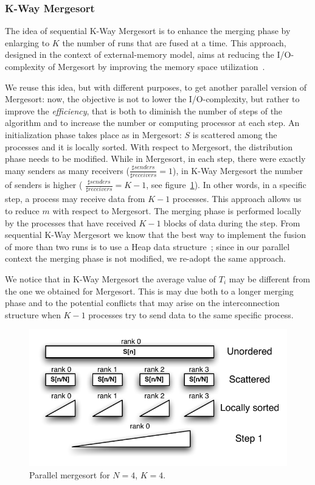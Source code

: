 \subsubsection{K-Way Mergesort}
\label{kmerge}
The idea of sequential K-Way Mergesort is to enhance the merging phase by enlarging to $K$ the number of runs that are fused at a time. This approach, designed in the context of external-memory model, aims at reducing the I/O-complexity of Mergesort by improving the memory space utilization~\cite{FERR}. 

We reuse this idea, but with different purposes, to get another parallel version of Mergesort: now, the objective is not to lower the I/O-complexity, but rather to improve the \textit{efficiency}, that is both to diminish the number of steps of the algorithm and to increase the number or computing processor at each step. An initialization phase takes place as in Mergesort: $S$ is scattered among the processes and it is locally sorted. With respect to Mergesort, the distribution phase needs to be modified. While in Mergesort, in each step, there were exactly many senders as many receivers ($\frac{\sharp senders}{\sharp receivers} = 1$), in K-Way Mergesort the number of senders is higher ( $\frac{\sharp senders}{\sharp receivers} = K - 1$, see figure~\ref{k-merge-dist}). In other words, in a specific step, a process may receive data from $K-1$ processes. This approach allows us to reduce $m$ with respect to Mergesort. The merging phase is performed locally by the processes that have received $K-1$ blocks of data during the step. From sequential K-Way Mergesort we know that the best way to implement the fusion of more than two runs is to use a Heap data structure~\cite{FERR}; since in our parallel context the merging phase is not modified, we re-adopt the same approach.

We notice that in K-Way Mergesort the average value of $T_i$ may be different from the one we obtained for Mergesort. This is may due both to a longer merging phase and to the potential conflicts that may arise on the interconnection structure when $K-1$ processes try to send data to the same specific process.

\begin{figure}[h]
        \centerline{
               \mbox{\includegraphics[scale=0.70]{kmerge-pict1}}
        }
        \caption{Parallel mergesort for $N = 4$, $K = 4$.}
        \label{k-merge-dist}
\end{figure}

